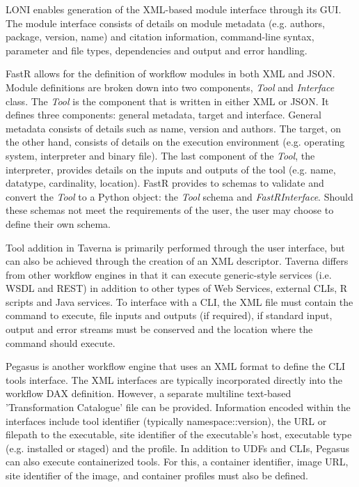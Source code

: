             LONI enables generation of the XML-based module interface through
            its GUI. The module interface consists of details on module metadata
            (e.g. authors, package, version, name) and citation information,
            command-line syntax, parameter and file types, dependencies and
            output and error handling.

            FastR allows for the definition of workflow modules in both XML and
            JSON. Module definitions are broken down into two components,
            \textit{Tool} and \textit{Interface} class. The \textit{Tool} is the
            component that is written in either XML or JSON. It defines three
            components: general metadata, target and interface. General metadata
            consists of details such as name, version and authors. The target,
            on the other hand, consists of details on the execution environment
            (e.g. operating system, interpreter and binary file). The last
            component of the \textit{Tool}, the interpreter, provides details on
            the inputs and outputs of the tool (e.g. name, datatype, cardinality,
            location). FastR provides to schemas to validate and convert the
            \textit{Tool} to a Python object: the \textit{Tool} schema and
            \textit{FastRInterface}. Should these schemas not meet the
            requirements of the user, the user may choose to define their own
            schema.

            Tool addition in Taverna is primarily performed through the user
            interface, but can also be achieved through the creation of an XML
            descriptor. Taverna differs from other workflow engines in that it
            can execute generic-style services (i.e. WSDL and REST) in addition
            to other types of Web Services, external CLIs, R scripts and Java
            services. To interface with a CLI, the XML file must contain the
            command to execute, file inputs and outputs (if required), if
            standard input, output and error streams must be conserved and the
            location where the command should execute.

            Pegasus is another workflow engine that uses an XML format to define
            the CLI tools interface. The XML interfaces are typically
            incorporated directly into the workflow DAX definition. However, a
            separate multiline text-based 'Transformation Catalogue' file can be
            provided. Information encoded within the interfaces include tool
            identifier (typically namespace::version), the URL or filepath to
            the executable, site identifier of the executable's host, executable
            type (e.g. installed or staged) and the profile. In addition to UDFs
            and CLIs, Pegasus can also execute containerized tools. For this, a
            container identifier, image URL, site identifier of the image, and
            container profiles must also be defined.

